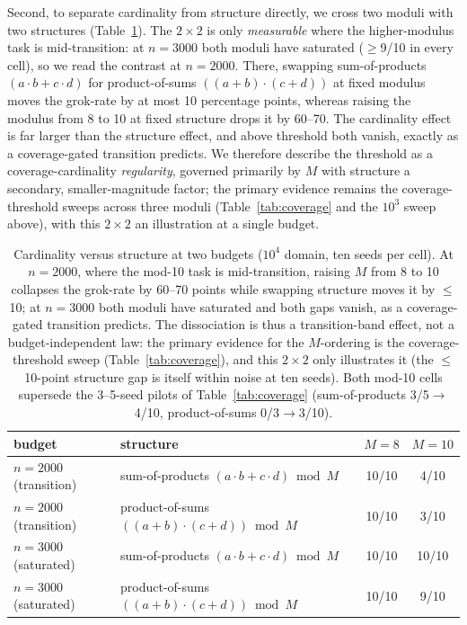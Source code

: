 \documentclass[10pt]{article} %
\begin{document}
Second, to separate cardinality from structure directly, we cross two moduli with two structures
(Table~\ref{tab:struct}). The $2\times2$ is only \emph{measurable} where the higher-modulus task is
mid-transition: at $n=3000$ both moduli have saturated ($\geq$9/10 in every cell), so we read the
contrast at $n=2000$. There, swapping sum-of-products $(a\cdot b + c\cdot d)$ for product-of-sums
$((a{+}b)\cdot(c{+}d))$ at fixed modulus moves the grok-rate by at most 10 percentage points, whereas
raising the modulus from 8 to 10 at fixed structure drops it by 60--70. The cardinality effect is far
larger than the structure effect, and above threshold both vanish, exactly as a coverage-gated
transition predicts. We therefore describe the threshold as a coverage-cardinality \emph{regularity},
governed primarily by $M$ with structure a secondary, smaller-magnitude factor; the primary evidence
remains the coverage-threshold sweeps across three moduli (Table~\ref{tab:coverage} and the $10^3$
sweep above), with this $2\times2$ an illustration at a single budget.

\begin{table}[t]
\caption{Cardinality versus structure at two budgets ($10^4$ domain, ten seeds per cell). At
$n=2000$, where the mod-10 task is mid-transition, raising $M$ from 8 to 10 collapses the grok-rate
by 60--70 points while swapping structure moves it by $\leq$10; at $n=3000$ both moduli have
saturated and both gaps vanish, as a coverage-gated transition predicts. The dissociation is thus a
transition-band effect, not a budget-independent law: the primary evidence for the $M$-ordering is
the coverage-threshold sweep (Table~\ref{tab:coverage}), and this $2\times2$ only illustrates it
(the $\leq$10-point structure gap is itself within noise at ten seeds). Both mod-10 cells supersede
the 3--5-seed pilots of Table~\ref{tab:coverage} (sum-of-products 3/5$\to$4/10, product-of-sums
0/3$\to$3/10).}
\label{tab:struct}
\begin{center}
\begin{tabular}{llcc}
\toprule
budget & structure & $M=8$ & $M=10$ \\
\midrule
$n=2000$ (transition) & sum-of-products $(a\cdot b + c\cdot d)\bmod M$ & 10/10 & 4/10 \\
$n=2000$ (transition) & product-of-sums $((a{+}b)\cdot(c{+}d))\bmod M$ & 10/10 & 3/10 \\
$n=3000$ (saturated)  & sum-of-products $(a\cdot b + c\cdot d)\bmod M$ & 10/10 & 10/10 \\
$n=3000$ (saturated)  & product-of-sums $((a{+}b)\cdot(c{+}d))\bmod M$ & 10/10 & 9/10 \\
\bottomrule
\end{tabular}
\end{center}
\end{table}
\end{document}
